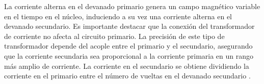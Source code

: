 La corriente alterna en el devanado primario genera un campo magnético variable en el tiempo en el núcleo, induciendo a su vez una corriente alterna en el devanado secundario. Es importante destacar que la conexión del transformador de corriente no afecta al circuito primario. La precisión de este tipo de transformador depende del acople entre el primario y el secundario, asegurando que la corriente secundaria sea proporcional a la corriente primaria en un rango más amplio de corriente. La corriente en el secundario se obtiene dividiendo la corriente en el primario entre el número de vueltas en el devanado secundario \cite{wiki_transformador_corriente}.






  
  